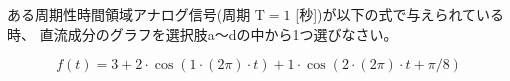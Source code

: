 ある周期性時間領域アナログ信号(周期 $\textrm{T} = 1$ [秒])が以下の式で与えられている時、
直流成分のグラフを選択肢a〜dの中から1つ選びなさい。

\[
f(t) = 
3
+ 2 \cdot \cos( 1 \cdot (2\pi) \cdot t )
+ 1 \cdot \cos( 2 \cdot (2\pi) \cdot t + \pi/8 )
\]
